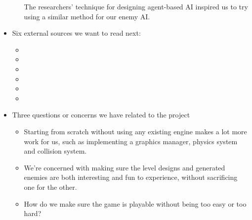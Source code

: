 \documentclass[a4paper, 10pt, american]{article}
\begin{document}
\begin{itemize}
\begin{itemize}
				The researchers' technique for designing agent-based AI inspired
				us to try using a similar method for our enemy AI.
		\end{itemize}
	\item Six external sources we want to read next:
		\begin{itemize}
			\item
			\item
			\item
			\item
			\item
			\item
		\end{itemize}
	\item Three questions or concerns we have related to the project
		\begin{itemize}
			\item Starting from scratch without using any existing engine makes
				a lot more work for us, such as implementing a graphics manager,
				physics system and collision system.
			\item We're concerned with making sure the level designs and
				generated enemies are both interesting and fun to experience,
				without sacrificing one for the other.
			\item How do we make sure the game is playable without being too
				easy or too hard?
		\end{itemize}
\end{itemize}



\end{document}
